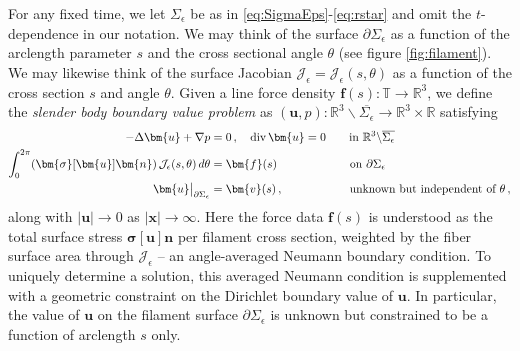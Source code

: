 \documentclass[11pt,reqno]{amsart}
\newcommand{\R}{\mathbb{R}}
\newcommand{\T}{\mathbb{T}}
\newcommand{\bu}{\bm{u}}
\newcommand{\bx}{\bm{x}}
\newcommand{\bv}{\bm{v}}
\newcommand{\p}{\partial}
\renewcommand{\div}{{\rm{div}\,}}
\newcommand{\abs}[1]{\left\lvert #1 \right\rvert}
\newcommand{\mc}[1]{\mathcal{#1}}
\theoremstyle{definition}
\begin{document}
For any fixed time, we let $\Sigma_\epsilon$ be as in \eqref{eq:SigmaEps}-\eqref{eq:rstar} and omit the $t$-dependence in our notation. We may think of the surface $\p\Sigma_\epsilon$ as a function of the arclength parameter $s$ and the cross sectional angle $\theta$ (see figure \ref{fig:filament}). We may likewise think of the surface Jacobian $\mc{J}_\epsilon=\mc{J}_\epsilon(s,\theta)$ as a function of the cross section $s$ and angle $\theta$.
Given a line force density $\bm{f}(s):\T\to\R^3$, we define the \emph{slender body boundary value problem} as $(\bu,p): \R^3\backslash \overline{\Sigma_\epsilon} \to \R^3\times\R$ satisfying 
\begin{equation}\label{eq:SB_PDE}
\begin{aligned}
-\Delta \bu +\nabla p &= 0\,, \quad \div\bu=0 \qquad \text{in }\R^3\backslash \overline{\Sigma_\epsilon} \\
\int_0^{2\pi}(\bm{\sigma}[\bu]\bm{n}) \, \mc{J}_\epsilon(s,\theta)\,d\theta &= \bm{f}(s) \qquad\qquad\qquad\; \text{on }\p\Sigma_\epsilon \\
\bu\big|_{\p\Sigma_\epsilon} &= \bv(s)\,, \qquad\qquad\quad\;\;\, \text{unknown but independent of }\theta\,,   
\end{aligned}
\end{equation}
along with $\abs{\bu}\to 0$ as $\abs{\bx}\to\infty$. Here the force data $\bm{f}(s)$ is understood as the total surface stress $\bm{\sigma}[\bu]\bm{n}$ per filament cross section, weighted by the fiber surface area through $\mc{J}_\epsilon$ -- an angle-averaged Neumann boundary condition. To uniquely determine a solution, this averaged Neumann condition is supplemented with a geometric constraint on the Dirichlet boundary value of $\bu$. In particular, the value of $\bu$ on the filament surface $\p\Sigma_\epsilon$ is unknown but constrained to be a function of arclength $s$ only. 
\end{document}
